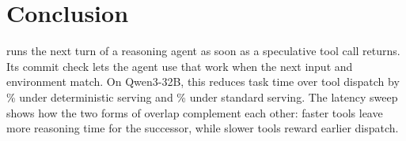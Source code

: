 \section{Conclusion}
\label{sec:conclusion}

\method runs the next turn of a reasoning agent as soon as a speculative tool call returns. Its commit check lets the agent use that work when the next input and environment match. On Qwen3-32B, this reduces task time over tool dispatch by \DetSaveOursDisp\% under deterministic serving and \StdSaveOursDisp\% under standard serving. The latency sweep shows how the two forms of overlap complement each other: faster tools leave more reasoning time for the successor, while slower tools reward earlier dispatch.

